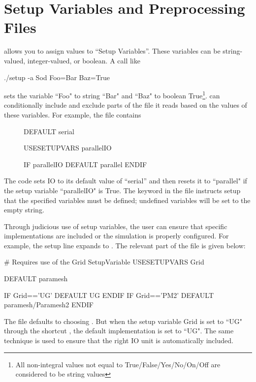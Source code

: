 \section{Setup Variables and Preprocessing  Files}
\label{Sec:setupvariables}

\setup allows you to assign values to ``Setup Variables''. These
variables can be string-valued, integer-valued, or boolean. A 
call like

\begin{codeseg}
./setup -a Sod Foo=Bar Baz=True
\end{codeseg}

\noindent sets the variable ``Foo" to string ``Bar" and ``Baz" to boolean 
True\footnote{All non-integral values not equal to
True/False/Yes/No/On/Off are considered to be string values}.
\setup can conditionally include and exclude parts of the
 file it reads based on the values of these variables.
For example, the  file contains

\begin{figure}[h]
\begin{shrink}
\begin{fcodeseg}
 DEFAULT serial

 USESETUPVARS parallelIO

 IF parallelIO
    DEFAULT parallel
 ENDIF
\end{fcodeseg}
\end{shrink}
\end{figure}

The code sets IO to its default value of ``serial'' and then resets
it to ``parallel" if the setup variable ``parallelIO" is True. The
 keyword in the  file instructs setup
that the specified variables must be defined; undefined variables
will be set to the empty string. 

Through judicious use of setup
variables, the user can ensure that specific implementations are included
or the simulation is properly configured.
For example, the setup line 
expands to .
The relevant part of the  file is given below:
\begin{shrink}
\begin{fcodeseg}
# Requires use of the Grid SetupVariable
USESETUPVARS Grid

DEFAULT paramesh

IF Grid=='UG'
   DEFAULT UG
ENDIF
IF Grid=='PM2'
   DEFAULT paramesh/Paramesh2
ENDIF
\end{fcodeseg}
\end{shrink}
The  file defaults to choosing \Paramesh. But
when the setup variable Grid is set to ``UG" through the shortcut , 
the default implementation is set to ``UG". The
same technique is used to ensure that the right IO unit is automatically
included.

